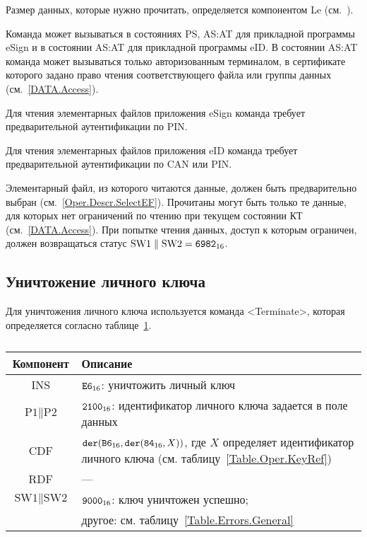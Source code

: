 Размер данных, которые нужно прочитать, определяется компонентом 
Le (см.~\cite{APDU}).

Команда может вызываться в состояниях PS, AS:AT 
для прикладной программы eSign и в состоянии 
AS:AT для прикладной программы eID.
В состоянии AS:AT команда может вызываться только 
авторизованным терминалом, в сертификате которого
задано право чтения соответствующего файла или группы данных
(см.~\ref{DATA.Access}).

Для чтения элементарных файлов приложения eSign команда требует 
предварительной аутентификации по PIN.

Для чтения элементарных файлов приложения eID команда требует 
предварительной аутентификации по CAN или PIN.

Элементарный файл, из которого читаются данные, должен быть предварительно 
выбран (см.~\ref{Oper.Descr.SelectEF}). Прочитаны могут быть только те данные, 
для которых нет ограничений по чтению при текущем состоянии КТ (см.~\ref{DATA.Access}). 
При попытке чтения данных, доступ к которым ограничен, должен возвращаться 
статус $\text{SW1} \parallel \text{SW2} = \texttt{6982}_{16}$.

\subsection{Уничтожение личного ключа}
\label{Oper.Descr.Terminate}

Для уничтожения личного ключа используется команда <Terminate>,
которая определяется согласно 
таблице~\ref{Table.Oper.TerminateCmd}.

\begin{table}[ht]
\caption{}\label{Table.Oper.TerminateCmd}
\begin{tabular}{|c|p{14cm}|}
\hline
Компонент & Описание\\
\hline
\hline
INS & $\texttt{E6}_{16}$: уничтожить личный ключ \\
\hline
$\text{P1} \parallel\text{P2}$ & $\texttt{2100}_{16}$:
идентификатор личного ключа задается в поле данных\\
\hline
CDF &  $\texttt{der}(\texttt{B6}_{16},\texttt{der}(\texttt{84}_{16}, X))$,
где $X$ определяет идентификатор личного ключа
(см. таблицу~\ref{Table.Oper.KeyRef})\\ 
\hline 
RDF & ---  \\
\hline
$\text{SW1} \parallel \text{SW2}$ & 
$\texttt{9000}_{16}$: ключ уничтожен успешно;\\
 & другое: см. таблицу~\ref{Table.Errors.General} \\
\hline
\end{tabular}
\end{table}

